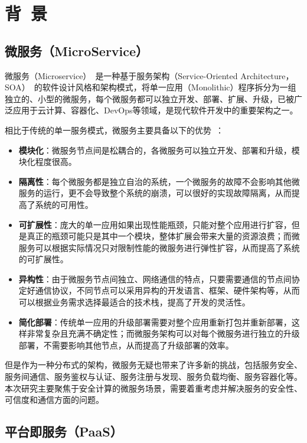 \section{背\ 景}\label{sec:background}

\subsection{微服务（MicroService）}
微服务（Microservice）~\cite{lewis2014microservices}是一种基于服务架构（Service-Oriented Architecture，SOA）~\cite{papazoglou2007service}的软件设计风格和架构模式，将单一应用（Monolithic）程序拆分为一组独立的、小型的微服务，每个微服务都可以独立开发、部署、扩展、升级，已被广泛应用于云计算、容器化、DevOps等领域，是现代软件开发中的重要架构之一。

相比于传统的单一服务模式，微服务主要具备以下的优势~\cite{ms-microservices}：

\begin{itemize}
    \item \textbf{模块化}：微服务节点间是松耦合的，各微服务可以独立开发、部署和升级，模块化程度很高。
    \item \textbf{隔离性}：每个微服务都是独立自治的系统，一个微服务的故障不会影响其他微服务的运行，更不会导致整个系统的崩溃，可以很好的实现故障隔离，从而提高了系统的可用性。
    \item \textbf{可扩展性}：庞大的单一应用如果出现性能瓶颈，只能对整个应用进行扩容，但是真正的瓶颈可能只是其中一个模块，整体扩展会带来大量的资源浪费；而微服务可以根据实际情况只对限制性能的微服务进行弹性扩容，从而提高了系统的可扩展性。
    \item \textbf{异构性}：由于微服务节点间独立、网络通信的特点，只要需要通信的节点间协定好通信协议，不同节点可以采用异构的开发语言、框架、硬件架构等，从而可以根据业务需求选择最适合的技术栈，提高了开发的灵活性。
    \item \textbf{简化部署}：传统单一应用的升级部署需要对整个应用重新打包并重新部署，这样非常复杂且充满不确定性；而微服务架构可以对每个微服务进行独立的升级部署，不需要影响其他节点，从而提高了升级部署的效率。
\end{itemize}

但是作为一种分布式的架构，微服务无疑也带来了许多新的挑战，包括服务安全、服务间通信、服务鉴权与认证、服务注册与发现、服务负载均衡、服务容器化等。本次研究主要聚焦于安全计算的微服务场景，需要着重考虑并解决服务的安全性、可信度和通信方面的问题。

\subsection{平台即服务（PaaS）}

